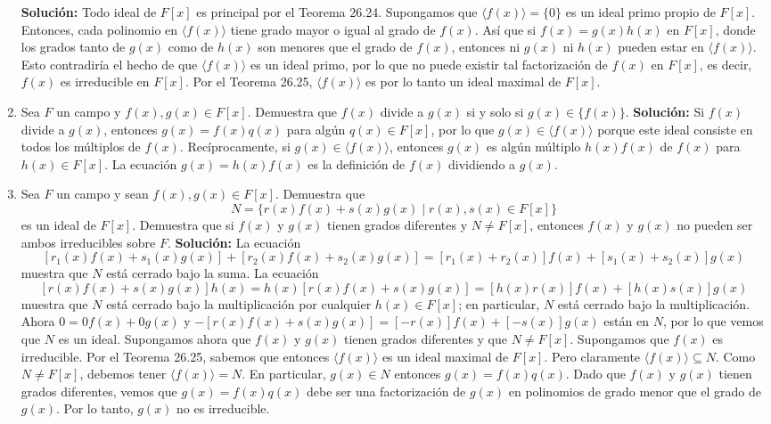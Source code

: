 \begin{enumerate}
    \textbf{Solución:} Todo ideal de $F[x]$ es principal por el Teorema 26.24. Supongamos que $\langle f(x) \rangle = \{0\}$ es un ideal primo propio de $F[x]$. Entonces, cada polinomio en $\langle f(x) \rangle$ tiene grado mayor o igual al grado de $f(x)$. Así que si $f(x) = g(x)h(x)$ en $F[x]$, donde los grados tanto de $g(x)$ como de $h(x)$ son menores que el grado de $f(x)$, entonces ni $g(x)$ ni $h(x)$ pueden estar en $\langle f(x) \rangle$. Esto contradiría el hecho de que $\langle f(x) \rangle$ es un ideal primo, por lo que no puede existir tal factorización de $f(x)$ en $F[x]$, es decir, $f(x)$ es irreducible en $F[x]$. Por el Teorema 26.25, $\langle f(x) \rangle$ es por lo tanto un ideal maximal de $F[x]$.
    \item Sea $F$ un campo y $f(x), g(x) \in F[x]$. Demuestra que $f(x)$ divide a $g(x)$ si y solo si $g(x) \in \{f(x)\}$.
    \textbf{Solución:} Si $f(x)$ divide a $g(x)$, entonces $g(x) = f(x)q(x)$ para algún $q(x) \in F[x]$, por lo que $g(x) \in \langle f(x) \rangle$ porque este ideal consiste en todos los múltiplos de $f(x)$. Recíprocamente, si $g(x) \in \langle f(x) \rangle$, entonces $g(x)$ es algún múltiplo $h(x)f(x)$ de $f(x)$ para $h(x) \in F[x]$. La ecuación $g(x) = h(x)f(x)$ es la definición de $f(x)$ dividiendo a $g(x)$.
    \item Sea $F$ un campo y sean $f(x), g(x) \in F[x]$. Demuestra que
    \[
    N = \{r(x)f(x) + s(x)g(x) \mid r(x), s(x) \in F[x]\}
    \]
    es un ideal de $F[x]$. Demuestra que si $f(x)$ y $g(x)$ tienen grados diferentes y $N \neq F[x]$, entonces $f(x)$ y $g(x)$ no pueden ser ambos irreducibles sobre $F$.
    \textbf{Solución:}
    La ecuación
    \[
    [r_1(x)f(x) + s_1(x)g(x)] + [r_2(x)f(x) + s_2(x)g(x)] = [r_1(x) + r_2(x)]f(x) + [s_1(x) + s_2(x)]g(x)
    \]
    muestra que $N$ está cerrado bajo la suma. La ecuación
    \[
    [r(x)f(x) + s(x)g(x)]h(x) = h(x)[r(x)f(x) + s(x)g(x)] = [h(x)r(x)]f(x) + [h(x)s(x)]g(x)
    \]
    muestra que $N$ está cerrado bajo la multiplicación por cualquier $h(x) \in F[x]$; en particular, $N$ está cerrado bajo la multiplicación. Ahora $0 = 0f(x) + 0g(x)$ y $-[r(x)f(x) + s(x)g(x)] = [-r(x)]f(x) + [-s(x)]g(x)$ están en $N$, por lo que vemos que $N$ es un ideal.
    Supongamos ahora que $f(x)$ y $g(x)$ tienen grados diferentes y que $N \neq F[x]$. Supongamos que $f(x)$ es irreducible. Por el Teorema 26.25, sabemos que entonces $\langle f(x) \rangle$ es un ideal maximal de $F[x]$. Pero claramente $\langle f(x) \rangle \subseteq N$. Como $N \neq F[x]$, debemos tener $\langle f(x) \rangle = N$. En particular, $g(x) \in N$ entonces $g(x) = f(x)q(x)$. Dado que $f(x)$ y $g(x)$ tienen grados diferentes, vemos que $g(x) = f(x)q(x)$ debe ser una factorización de $g(x)$ en polinomios de grado menor que el grado de $g(x)$. Por lo tanto, $g(x)$ no es irreducible.

\end{enumerate}
